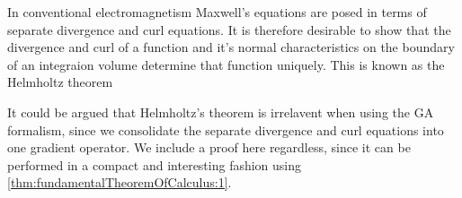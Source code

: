 %
%
In conventional electromagnetism Maxwell's equations are posed in terms of separate divergence and curl equations.  It is therefore desirable to show that the divergence and curl of a function and it's normal characteristics on the boundary of an integraion volume determine that function uniquely.  This is known as the Helmholtz theorem

It could be argued that Helmholtz's theorem is irrelavent when using the GA formalism, since we consolidate the separate divergence and curl equations into one gradient operator.
We include a proof here regardless, since it can be performed in a compact and interesting fashion using
\cref{thm:fundamentalTheoremOfCalculus:1}.
